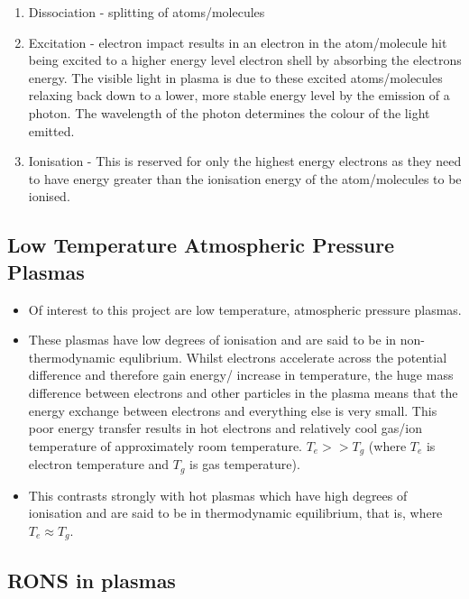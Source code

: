 \documentclass[11pt, oneside]{article}   	%
\begin{document}
\begin{itemize}
\begin{enumerate}
\item Dissociation - splitting of atoms/molecules
\item Excitation - electron impact results in an electron in the atom/molecule hit being excited to a higher energy level electron shell by absorbing the electrons energy. The visible light in plasma is due to these excited atoms/molecules relaxing back down to a lower, more stable energy level by the emission of a photon. The wavelength of the photon determines the colour of the light emitted.
\item Ionisation - This is reserved for only the highest energy electrons as they need to have energy greater than the ionisation energy of the atom/molecules to be ionised.
\end{enumerate}

\end{itemize}

\subsection{Low Temperature Atmospheric Pressure Plasmas}

\begin{itemize}

\item Of interest to this project are low temperature, atmospheric pressure plasmas.
\item These plasmas have low degrees of ionisation and are said to be in non-thermodynamic equlibrium. 
Whilst electrons accelerate across the potential difference and therefore gain energy/ increase in temperature, the huge mass difference between electrons and other particles in the plasma means that the energy exchange between electrons and everything else is very small. 
This poor energy transfer results in hot electrons and relatively cool gas/ion temperature of approximately room temperature. $T_e >> T_g$ (where $T_e$ is electron temperature and $T_g$ is gas temperature).
\item This contrasts strongly with hot plasmas which have high degrees of ionisation and are said to be in thermodynamic equilibrium, that is, where $T_e \approx T_g$.

\end{itemize}

\subsection{RONS in plasmas}
\end{document}
